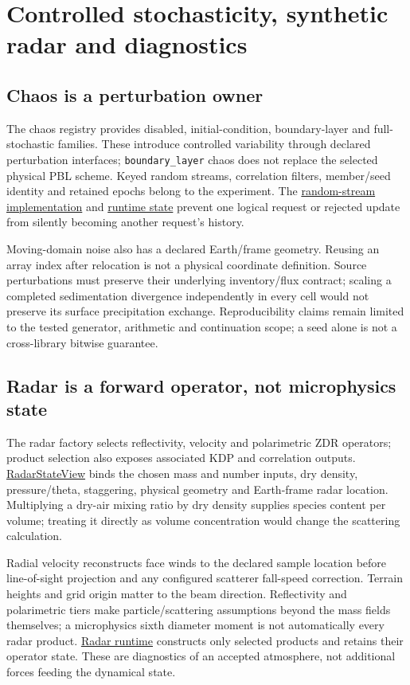 \section{Controlled stochasticity, synthetic radar and diagnostics}

\subsection{Chaos is a perturbation owner}

The chaos registry provides disabled, initial-condition, boundary-layer and
full-stochastic families. These introduce controlled variability through
declared perturbation interfaces; \texttt{boundary\_layer} chaos does not
replace the selected physical PBL scheme. Keyed random streams, correlation
filters, member/seed identity and retained epochs belong to the experiment.
The \href{../src/chaos/base/random_generator.cpp}{random-stream implementation}
and \href{../src/chaos/runtime_state.cpp}{runtime state} prevent one logical
request or rejected update from silently becoming another request's history.

Moving-domain noise also has a declared Earth/frame geometry. Reusing an array
index after relocation is not a physical coordinate definition. Source
perturbations must preserve their underlying inventory/flux contract; scaling
a completed sedimentation divergence independently in every cell would not
preserve its surface precipitation exchange. Reproducibility claims remain
limited to the tested generator, arithmetic and continuation scope; a seed
alone is not a cross-library bitwise guarantee.

\subsection{Radar is a forward operator, not microphysics state}

The radar factory selects reflectivity, velocity and polarimetric ZDR operators;
product selection also exposes associated KDP and correlation outputs.
\href{../include/radar/radar_base.hpp}{RadarStateView} binds the chosen mass
and number inputs, dry density, pressure/theta, staggering, physical geometry
and Earth-frame radar location. Multiplying a dry-air mixing ratio by dry
density supplies species content per volume; treating it directly as volume
concentration would change the scattering calculation.

Radial velocity reconstructs face winds to the declared sample location before
line-of-sight projection and any configured scatterer fall-speed correction.
Terrain heights and grid origin matter to the beam direction. Reflectivity
and polarimetric tiers make particle/scattering assumptions beyond the mass
fields themselves; a microphysics sixth diameter moment is not automatically
every radar product. \href{../src/radar/runtime.cpp}{Radar runtime} constructs
only selected products and retains their operator state. These are diagnostics
of an accepted atmosphere, not additional forces feeding the dynamical state.

